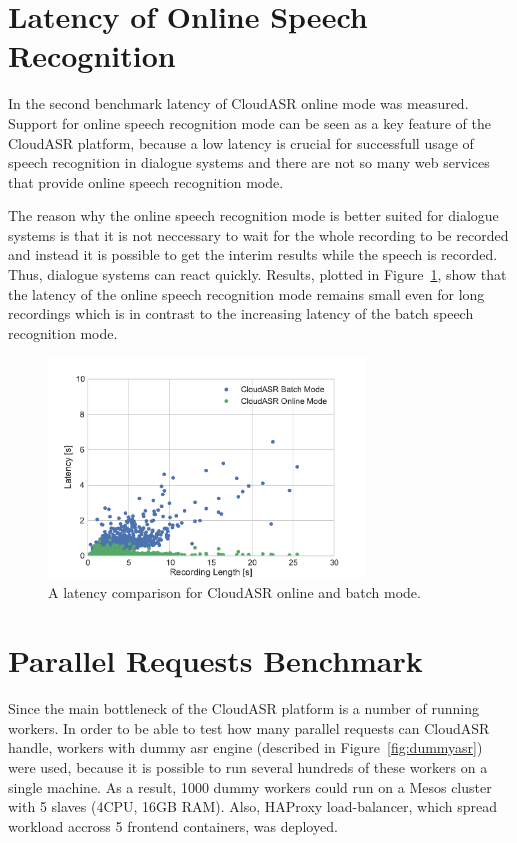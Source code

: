 \section{Latency of Online Speech Recognition}
In the second benchmark latency of CloudASR online mode was measured.
Support for online speech recognition mode can be seen as a key feature of the CloudASR platform,
  because a low latency is crucial for successfull usage of speech recognition in dialogue systems
  and there are not so many web services that provide online speech recognition mode.

The reason why the online speech recognition mode is better suited for dialogue systems is
  that it is not neccessary to wait for the whole recording to be recorded
  and instead it is possible to get the interim results while the speech is recorded.
Thus, dialogue systems can react quickly.
Results, plotted in Figure~\ref{fig:online-benchmark}, show that
  the latency of the online speech recognition mode remains small even for long recordings
  which is in contrast to the increasing latency of the batch speech recognition mode.

\begin{figure}[h]
  \centering
  \includegraphics[width=0.75\textwidth]{./img/online.pdf}

  \caption{
    A latency comparison for CloudASR online and batch mode.
  }
  \label{fig:online-benchmark}
\end{figure}


\section{Parallel Requests Benchmark}
Since the main bottleneck of the CloudASR platform is a number of running workers.
In order to be able to test how many parallel requests can CloudASR handle,
  workers with dummy asr engine (described in Figure~\ref{fig:dummyasr}) were used,
  because it is possible to run several hundreds of these workers on a single machine.
As a result, 1000 dummy workers could run on a Mesos cluster with 5 slaves (4CPU, 16GB RAM).
Also, HAProxy load-balancer, which spread workload accross 5 frontend containers, was deployed.

